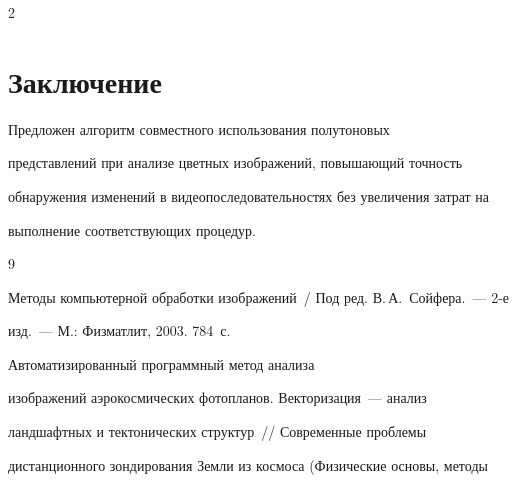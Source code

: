 \begin{multicols}{2}
\vspace*{-10pt}



\section{Заключение}



\vspace*{-2pt}



  Предложен алгоритм совместного использования полутоновых

представлений при анализе цветных изображений, повышающий точность

обнаружения изменений в видеопоследовательностях без увеличения затрат на

выполнение соответствующих процедур.



\vspace*{-10pt}



{\small\frenchspacing

 {%


 \begin{thebibliography}{9}



 \vspace*{-2pt}




Методы компьютерной обработки изображений~/ Под ред. В.\,А.~Сойфера.~--- 2-е

изд.~--- М.: Физматлит, 2003. 784~с.



\columnbreak









 Автоматизированный программный \mbox{метод} анализа

изображений аэрокосмических фотопланов. Векторизация~--- анализ

ландшафтных и тек\-то\-ни\-ческих структур~// Современные проб\-ле\-мы

дистан\-ционного зондирования Земли из космо\-са (Физические основы, методы


\end{thebibliography}}}
\end{multicols}
